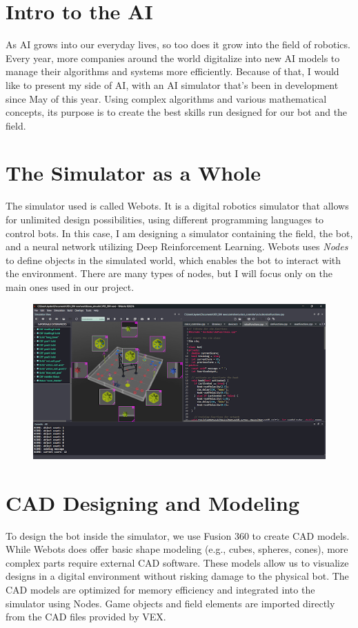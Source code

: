 \label{simulation}

\section*{Intro to the AI}
As AI grows into our everyday lives, so too does it grow into the field of robotics. Every year, more companies around the world digitalize into new AI models to manage their algorithms and systems more efficiently. Because of that, I would like to present my side of AI, with an AI simulator that's been in development since May of this year. Using complex algorithms and various mathematical concepts, its purpose is to create the best skills run designed for our bot and the field.

\section*{The Simulator as a Whole}
The simulator used is called Webots. It is a digital robotics simulator that allows for unlimited design possibilities, using different programming languages to control bots. In this case, I am designing a simulator containing the field, the bot, and a neural network utilizing Deep Reinforcement Learning. Webots uses \textit{Nodes} to define objects in the simulated world, which enables the bot to interact with the environment. There are many types of nodes, but I will focus only on the main ones used in our project.

\begin{figure}
    \includegraphics[width=0.9\linewidth]{images/simsoftware}
    \label{fig:simsoftware}
\end{figure}

\section*{CAD Designing and Modeling}
To design the bot inside the simulator, we use Fusion 360 to create CAD models. While Webots does offer basic shape modeling (e.g., cubes, spheres, cones), more complex parts require external CAD software. These models allow us to visualize designs in a digital environment without risking damage to the physical bot. The CAD models are optimized for memory efficiency and integrated into the simulator using Nodes. Game objects and field elements are imported directly from the CAD files provided by VEX.

